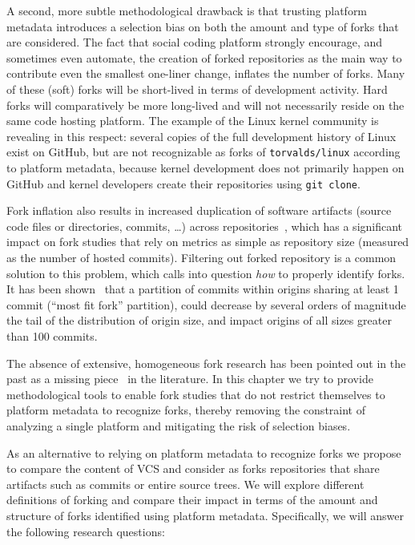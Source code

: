 A second, more subtle methodological drawback is that trusting platform
metadata introduces a selection bias on both the amount and type of forks that
are considered. The fact that social coding platform strongly encourage, and
sometimes even automate, the creation of forked repositories as the main way to
contribute even the smallest one-liner change, inflates the number of forks.
Many of these (soft) forks will be short-lived in terms of development
activity. Hard forks will comparatively be more long-lived and will not
necessarily reside on the same code hosting platform. The example of the Linux
kernel community is revealing in this respect: several copies of the full
development history of Linux exist on GitHub, but are not recognizable as forks
of \texttt{torvalds/linux} according to platform metadata, because kernel
development does not primarily happen on GitHub and kernel developers create
their repositories using \texttt{git clone}.

Fork inflation also results in increased duplication of software artifacts
(source code files or directories, commits, \ldots) across
repositories~\cite{swh-provenance-emse}, which has a significant impact on fork
studies that rely on metrics as simple as repository size (measured as the
number of hosted commits). Filtering out forked repository is a common solution
to this problem, which calls into question \emph{how} to properly identify
forks.
It has been shown~\cite{swh-provenance-emse} that a partition of commits within
origins sharing at least 1 commit (``most fit fork'' partition), could decrease
by several orders of magnitude the tail of the distribution of origin size, and
impact origins of all sizes greater than 100 commits.

\smallskip

The absence of extensive, homogeneous fork research has been pointed out in the
past as a missing piece~\cite{robles2012forks} in the literature. In this
chapter we try to provide methodological tools to enable fork studies that do
not restrict themselves to platform metadata to recognize forks, thereby
removing the constraint of analyzing a single platform and mitigating the risk
of selection biases.

As an alternative to relying on platform metadata to recognize forks we propose
to compare the content of VCS and consider as forks repositories that share
artifacts such as commits or entire source trees. We will explore different
definitions of forking and compare their impact in terms of the amount and
structure of forks identified using platform metadata. Specifically, we will
answer the following research questions:

